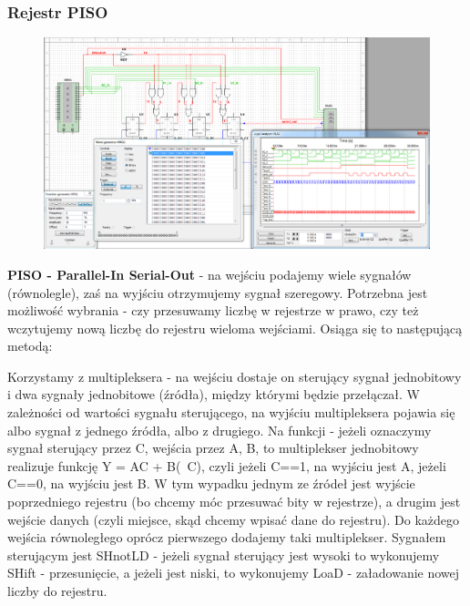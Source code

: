 \documentclass[12pt,a4paper]{article}
\begin{document}
\subsubsection{Rejestr PISO}
\begin{figure}[H]
\centering
\includegraphics[width=\textwidth]{img/3hPISO}
\end{figure}

\textbf{PISO - Parallel-In Serial-Out} - na wejściu podajemy wiele sygnałów (równolegle), zaś na wyjściu otrzymujemy sygnał szeregowy. Potrzebna jest  możliwość wybrania - czy przesuwamy liczbę w rejestrze w prawo, czy też wczytujemy nową liczbę do rejestru wieloma wejściami. Osiąga się to następującą metodą:


Korzystamy z multipleksera - na wejściu dostaje on sterujący sygnał jednobitowy i dwa sygnały jednobitowe (źródła), między którymi będzie przełączał. W zależności od wartości sygnału sterującego, na wyjściu multipleksera pojawia się albo sygnał z jednego źródła, albo z drugiego. Na funkcji - jeżeli oznaczymy sygnał sterujący przez C, wejścia przez A, B, to multiplekser jednobitowy realizuje funkcję Y = AC + B(~C), czyli jeżeli C==1, na wyjściu jest A, jeżeli C==0, na wyjściu jest B.
W tym wypadku jednym ze źródeł jest wyjście poprzedniego rejestru (bo chcemy móc przesuwać bity w rejestrze), a drugim jest wejście danych (czyli miejsce, skąd chcemy wpisać dane do rejestru). 
Do każdego wejścia równoległego oprócz pierwszego dodajemy taki multiplekser. Sygnałem sterującym jest SHnotLD - jeżeli sygnał sterujący jest wysoki to wykonujemy SHift - przesunięcie, a jeżeli jest niski, to wykonujemy LoaD - załadowanie nowej liczby do rejestru.
\end{document}
